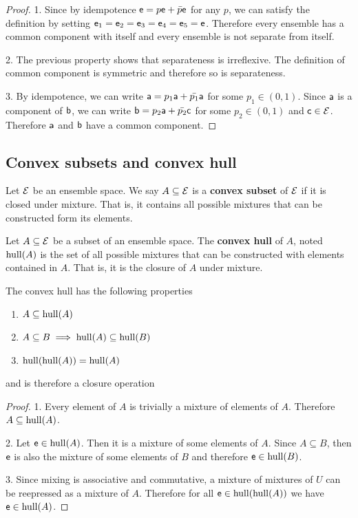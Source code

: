 \begin{proof}
	1. Since by idempotence $\ens = p \ens + \bar{p} \ens$ for any $p$, we can satisfy the definition by setting $\ens_1 = \ens_2 = \ens_3 = \ens_4 = \ens_5 = \ens$. Therefore every ensemble has a common component with itself and every ensemble is not separate from itself.
	
	2. The previous property shows that separateness is irreflexive. The definition of common component is symmetric and therefore so is separateness.
	
	3. By idempotence, we can write $\ens[a] = p_1 \ens[a] + \bar{p_1} \ens[a]$ for some $p_1 \in (0,1)$. Since $\ens[a]$ is a component of $\ens[b]$, we can write $\ens[b] = p_2 \ens[a] + \bar{p_2} \ens[c]$ for some $p_2 \in (0, 1)$ and $\ens[c] \in \Ens$. Therefore $\ens[a]$ and $\ens[b]$ have a common component.
\end{proof}

\subsection{Convex subsets and convex hull}

\begin{defn}
	Let $\Ens$ be an ensemble space. We say $A \subseteq \Ens$ is a \textbf{convex subset} of $\Ens$ if it is closed under mixture. That is, it contains all possible mixtures that can be constructed form its elements.
\end{defn}

\begin{defn}
	Let $A \subseteq \Ens$ be a subset of an ensemble space. The \textbf{convex hull} of $A$, noted $\hull(A)$ is the set of all possible mixtures that can be constructed with elements contained in $A$. That is, it is the closure of $A$ under mixture.
\end{defn}

\begin{coro}\label{pm_es_hullProp}
	The convex hull has the following properties
	\begin{enumerate}
		\item $A \subseteq \hull(A)$
		\item $A \subseteq B \implies \hull(A) \subseteq \hull(B)$
		\item $\hull(\hull(A)) = \hull(A)$
	\end{enumerate}
	and is therefore a closure operation
\end{coro}

\begin{proof}
	1. Every element of $A$ is trivially a mixture of elements of $A$. Therefore $A \subseteq \hull(A)$.
	
	2. Let $\ens \in \hull(A)$. Then it is a mixture of some elements of $A$. Since $A \subseteq B$, then $\ens$ is also the mixture of some elements of $B$ and therefore $\ens \in \hull(B)$.
	
	3. Since mixing is associative and commutative, a mixture of mixtures of $U$ can be reepressed as a mixture of $A$. Therefore for all $\ens \in \hull(\hull(A))$ we have $\ens \in \hull(A)$.
\end{proof}

